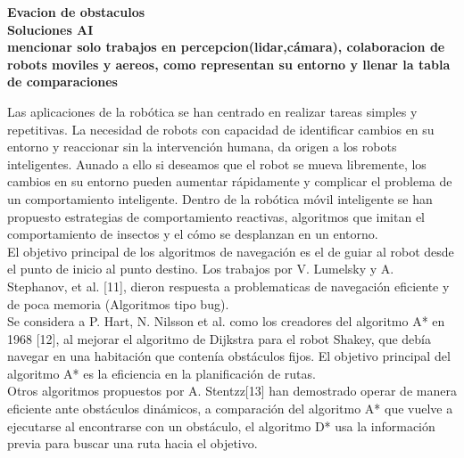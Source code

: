 \documentclass[11pt,epsf,times]{article}
\begin{document}
\textbf{Evacion de obstaculos}\\

\textbf{Soluciones AI}\\

\textbf{mencionar solo trabajos en percepcion(lidar,cámara), colaboracion de robots moviles y aereos, como representan su entorno y llenar la tabla de comparaciones}


\vspace{1cm}

Las aplicaciones de la rob\'{o}tica se han centrado en realizar tareas simples y repetitivas. La necesidad de robots con capacidad de identificar cambios en su entorno y reaccionar sin la intervenci\'{o}n humana, da origen a los robots inteligentes. Aunado a ello si deseamos que el robot se mueva libremente, los cambios en su entorno pueden aumentar r\'{a}pidamente y complicar el problema de un comportamiento inteligente. Dentro de la rob\'{o}tica m\'{o}vil inteligente se han propuesto estrategias de comportamiento reactivas, algoritmos que imitan el comportamiento de insectos y el c\'{o}mo se desplanzan en un entorno.\\
El objetivo principal de los algoritmos de navegaci\'{o}n es el de guiar al robot desde el punto de inicio al punto destino. Los trabajos por V. Lumelsky y A. Stephanov, et al. [11], dieron respuesta a problematicas de navegaci\'{o}n eficiente y de poca memoria (Algoritmos tipo bug).\\
Se considera a P. Hart, N. Nilsson et al. como los creadores del algoritmo A* en 1968 [12], al mejorar el algoritmo de Dijkstra para el robot Shakey, que deb\'{i}a navegar en una habitaci\'{o}n que conten\'{i}a obst\'{a}culos fijos. El objetivo principal del algoritmo A* es la eficiencia en la planificaci\'{o}n de rutas.\\
Otros algoritmos propuestos por A. Stentzz[13] han demostrado operar de manera eficiente ante obst\'{a}culos din\'{a}micos, a comparaci\'{o}n del algoritmo A* que vuelve a ejecutarse al encontrarse con un obst\'{a}culo, el algoritmo D* usa la informaci\'{o}n previa para buscar una ruta hacia el objetivo.\\
\end{document}
